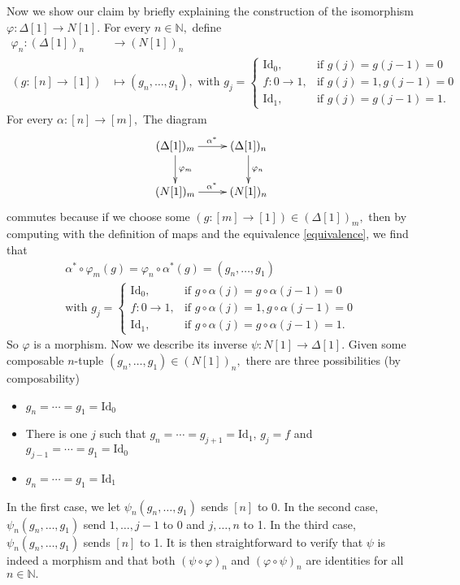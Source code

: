 \documentclass{article}
\begin{document}
Now we show our claim by briefly explaining the construction of the isomorphism $\varphi\colon\Delta[1]\rightarrow N[1].$ For every $n\in\mathbb{N},$ define
\begin{align*}
  \varphi_n\colon(\Delta[1])_n & \rightarrow (N[1])_n \\
  (g\colon[n]\rightarrow[1]) & \mapsto(g_n,\ldots,g_1),\text{ with }
  g_j=\begin{cases}
        \text{Id}_0, & \mbox{if } g(j)=g(j-1)=0 \\
        f\colon0\rightarrow1, & \mbox{if } g(j)=1, g(j-1)=0 \\
        \text{Id}_1, & \mbox{if }g(j)=g(j-1)=1.
      \end{cases}
\end{align*}
For every $\alpha\colon[n]\rightarrow[m],$ The diagram
\[\xymatrix{(\Delta[1])_m\ar[d]^{\varphi_m}\ar[r]^{\alpha^*} &(\Delta[1])_n\ar[d]^{\varphi_n}\\
(N[1])_m\ar[r]^{\alpha^*} & (N[1])_n}\]
commutes because if we choose some $(g\colon[m]\rightarrow[1])\in(\Delta[1])_m,$ then by computing with the definition of maps and the equivalence \eqref{equivalence}, we find that 
\begin{gather*}
  \alpha^*\circ\varphi_m(g)=\varphi_n\circ\alpha^*(g)=(g_n,\ldots,g_1) \\
  \text{with }g_j=\begin{cases}
        \text{Id}_0, & \mbox{if } g\circ\alpha(j)=g\circ\alpha(j-1)=0 \\
        f\colon0\rightarrow1, & \mbox{if } g\circ\alpha(j)=1, g\circ\alpha(j-1)=0 \\
        \text{Id}_1, & \mbox{if }g\circ\alpha(j)=g\circ\alpha(j-1)=1.
                         \end{cases}    
\end{gather*}
So $\varphi$ is a morphism. Now we describe its inverse $\psi\colon N[1]\rightarrow\Delta[1]$. Given some composable $n$-tuple $(g_n,\ldots,g_1)\in(N[1])_n,$ there are three possibilities (by composability)
\begin{itemize}
  \item $g_n=\cdots=g_1=\text{Id}_0$
  \item There is one $j$ such that $g_n=\cdots=g_{j+1}=\text{Id}_1,\,g_j=f$ and $g_{j-1}=\cdots=g_1=\text{Id}_0$
  \item $g_n=\cdots=g_1=\text{Id}_1$
\end{itemize}
In the first case, we let $\psi_n(g_n,\ldots,g_1)$ sends $[n]$ to $0.$ In the second case, $\psi_n(g_n,\ldots,g_1)$ send $1,\ldots,j-1$ to 0 and $j,\ldots,n$ to 1. In the third case, $\psi_n(g_n,\ldots,g_1)$ sends $[n]$ to 1. It is then straightforward to verify that $\psi$ is indeed a morphism and that both $(\psi\circ\varphi)_n$ and $(\varphi\circ\psi)_n$ are identities for all $n\in\mathbb{N}.$
\end{document}
